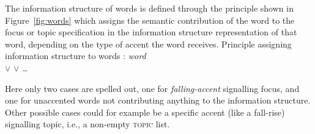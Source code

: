 \documentclass[output=paper,biblatex,babelshorthands,newtxmath,draftmode,colorlinks,citecolor=brown]{langscibook}
\begin{document}
The information structure of words is defined through the principle
shown in Figure~\ref{fig:words} which assigns the semantic
contribution of the word to the focus or topic specification in the
information structure representation of that word, depending on the
type of accent the word receives.
\ea
Principle assigning information structure to words \citep[167]{deKuthy2002a}:
\textit{word}\ \impl\\
	 $\lor$  $\lor$ \ldots
    \label{fig:words}
\z

\noindent
Here only two cases are spelled out, one for \textit{falling-accent}
signalling focus, and one for unaccented words not contributing
anything to the information structure. Other possible cases could for
example be a specific accent (like a fall-rise) signalling topic,
i.e., a non-empty \textsc{topic} list.
\end{document}
